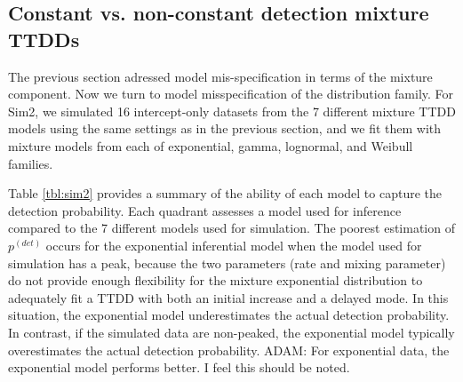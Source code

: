\documentclass[useAMS,usenatbib,referee,12pt]{article}
\newcommand{\adam}[1]{{\color{blue} ADAM: #1}}
\newcommand{\pdet}{p^{(det)}}
\begin{document}
\subsection{Constant vs. non-constant detection mixture TTDDs}\label{sec:family}

The previous section adressed model mis-specification in terms of the mixture component. 
Now we turn to model misspecification of the distribution family. 
For Sim2, we simulated 16 intercept-only datasets from the 7 different mixture TTDD models using the same settings as in the previous section, and we fit them with mixture models from each of exponential, gamma, lognormal, and Weibull families.

Table \ref{tbl:sim2} provides a summary of the ability of each model to capture the detection probability. 
Each quadrant assesses a model used for inference compared to the 7 different models used for simulation. 
The poorest estimation of $\pdet$ occurs for the exponential inferential model when the model used for simulation has a peak, because the two parameters (rate and mixing parameter) do not provide enough flexibility for the mixture exponential distribution to adequately fit a TTDD with both an initial increase and a delayed mode. 
In this situation, the exponential model underestimates the actual detection probability.
In contrast, if the simulated data are non-peaked, the exponential model typically overestimates the actual detection probability. 
\adam{For exponential data, the exponential model performs better.  I feel this should be noted.}
\end{document}
